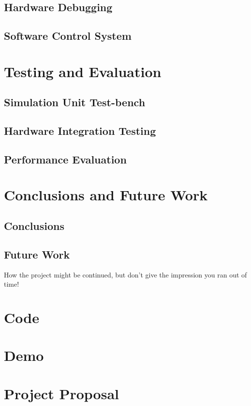 \documentclass[a4paper]{report}
\begin{document}
\section{Hardware Debugging}

\section{Software Control System}

\chapter{Testing and Evaluation}

\section{Simulation Unit Test-bench}

\section{Hardware Integration Testing}

\section{Performance Evaluation}

\chapter{Conclusions and Future Work}

\section{Conclusions}

\section{Future Work}
How the project might be continued, but don't give the impression you ran out of time!

\printbibliography[title=References]

\appendix

\chapter{Code}

\chapter{Demo}

\chapter{Project Proposal}
\end{document}
